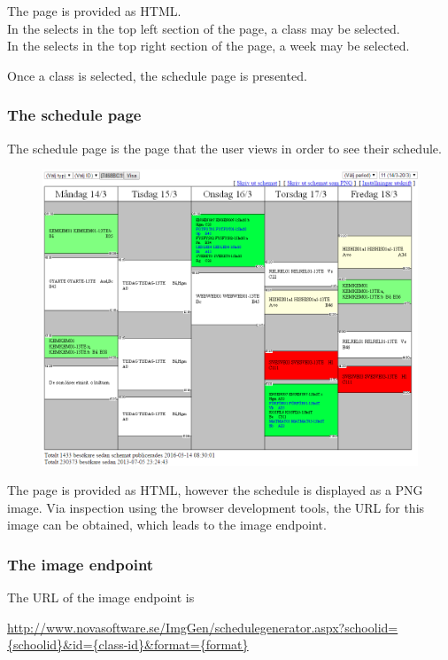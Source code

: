 \documentclass{article}
\begin{document}
	The page is provided as HTML.\\
	In the selects in the top left section of the page, a class may be selected.\\
	In the selects in the top right section of the page, a week may be selected.
	
	Once a class is selected, the schedule page is presented.
	
	\newpage
	
	\subsubsection{The schedule page}
	
	The schedule page is the page that the user views in order to see their schedule.
	
	\begin{figure}[h]
		\centering
		\includegraphics[width=0.9\linewidth]{images/schedule-page}
		\caption{}
		\label{fig:schedule-page}
	\end{figure}
	
	The page is provided as HTML, however the schedule is displayed as a PNG image.
	Via inspection using the browser development tools, the URL for this image can be obtained, which leads to the image endpoint.
	
	\subsubsection{The image endpoint}\label{image endpoint}
	The URL of the image endpoint is
	
	\url{http://www.novasoftware.se/ImgGen/schedulegenerator.aspx?schoolid={schoolid}&id={class-id}&format={format}}
	
\end{document}
